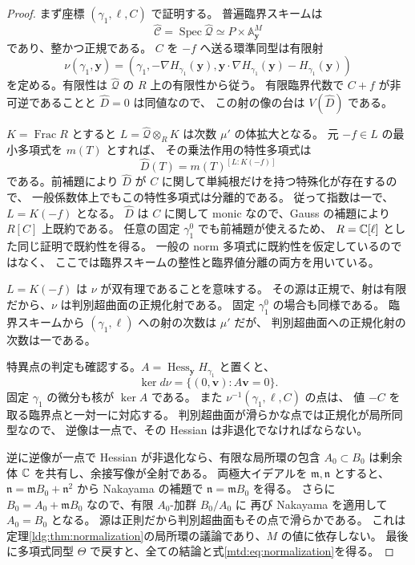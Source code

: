 \begin{proof}
まず座標 $(\gamma_1,\ell,C)$ で証明する。
普遍臨界スキームは
\[
 \widehat{\mathscr C}=\operatorname{Spec}\widehat{\mathcal Q}
       \simeq P\times\mathbb A^M_{\mathbf y}
\]
であり、整かつ正規である。
$C$ を $-f$ へ送る環準同型は有限射
\[
 \nu(\gamma_1,\mathbf y)=
 \left(\gamma_1,-\nabla H_{\gamma_1}(\mathbf y),
  \mathbf y\cdot\nabla H_{\gamma_1}(\mathbf y)-H_{\gamma_1}(\mathbf y)\right)
\]
を定める。有限性は $\widehat{\mathcal Q}$ の $R$ 上の有限性から従う。
有限臨界代数で $C+f$ が非可逆であることと $\widehat D=0$ は同値なので、
この射の像の台は $V(\widehat D)$ である。

$K=\operatorname{Frac}R$ とすると
$L=\widehat{\mathcal Q}\otimes_RK$ は次数 $\mu'$ の体拡大となる。
元 $-f\in L$ の最小多項式を $m(T)$ とすれば、
その乗法作用の特性多項式は
\[
                 \widehat D(T)=m(T)^{[L:K(-f)]}
\]
である。前補題により $\widehat D$ が $C$ に関して単純根だけを持つ特殊化が存在するので、
一般係数体上でもこの特性多項式は分離的である。
従って指数は一で、$L=K(-f)$ となる。
$\widehat D$ は $C$ に関して monic なので、Gauss の補題により $R[C]$ 上既約である。
任意の固定 $\gamma_1^0$ でも前補題が使えるため、
$R=\mathbb C[\ell]$ とした同じ証明で既約性を得る。
一般の norm 多項式に既約性を仮定しているのではなく、
ここでは臨界スキームの整性と臨界値分離の両方を用いている。

$L=K(-f)$ は $\nu$ が双有理であることを意味する。
その源は正規で、射は有限だから、$\nu$ は判別超曲面の正規化射である。
固定 $\gamma_1^0$ の場合も同様である。
臨界スキームから $(\gamma_1,\ell)$ への射の次数は $\mu'$ だが、
判別超曲面への正規化射の次数は一である。

特異点の判定も確認する。$A=\operatorname{Hess}_{\mathbf y}H_{\gamma_1}$ と置くと、
\[
          \ker d\nu=\{(0,\mathbf v):A\mathbf v=0\}.
\]
固定 $\gamma_1$ の微分も核が $\ker A$ である。
また $\nu^{-1}(\gamma_1,\ell,C)$ の点は、
値 $-C$ を取る臨界点と一対一に対応する。
判別超曲面が滑らかな点では正規化が局所同型なので、
逆像は一点で、その Hessian は非退化でなければならない。

逆に逆像が一点で Hessian が非退化なら、有限な局所環の包含
$A_0\subset B_0$ は剰余体 $\mathbb C$ を共有し、余接写像が全射である。
両極大イデアルを $\mathfrak m,\mathfrak n$ とすると、
$\mathfrak n=\mathfrak mB_0+\mathfrak n^2$ から
Nakayama の補題で $\mathfrak n=\mathfrak mB_0$ を得る。
さらに $B_0=A_0+\mathfrak mB_0$ なので、有限 $A_0$-加群 $B_0/A_0$ に
再び Nakayama を適用して $A_0=B_0$ となる。
源は正則だから判別超曲面もその点で滑らかである。
これは定理\ref{ldg:thm:normalization}の局所環の議論であり、$M$ の値に依存しない。
最後に多項式同型 $\Theta$ で戻すと、全ての結論と式\eqref{mtd:eq:normalization}を得る。
\end{proof}

